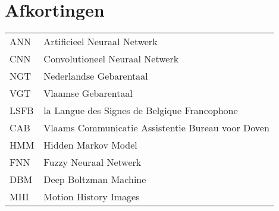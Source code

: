 \chapter{Afkortingen}

\renewcommand{\baselinestretch}{1.5}
\small\normalsize
\begin{longtable}{ll}
	ANN & Artificieel Neuraal Netwerk \\
	CNN & Convolutioneel Neuraal Netwerk \\
	NGT & Nederlandse Gebarentaal \\
	VGT & Vlaamse Gebarentaal \\
	LSFB & la Langue des Signes de Belgique Francophone \\
	CAB & Vlaams Communicatie Assistentie Bureau voor Doven \\
	HMM & Hidden Markov Model \\
	FNN & Fuzzy Neuraal Netwerk \\
	DBM & Deep Boltzman Machine \\
	MHI & Motion History Images \\
	
\end{longtable}
